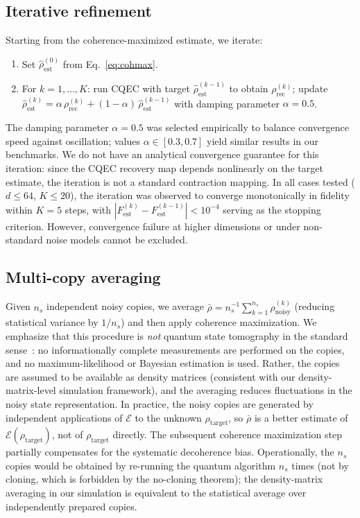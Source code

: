 \documentclass[a4paper,onecolumn]{quantumarticle}
\newcommand{\EE}{\mathcal{E}}
\newcommand{\Fest}{F_\mathrm{est}}
\newcommand{\rhot}{\rho_\mathrm{target}}
\newcommand{\rhon}{\rho_\mathrm{noisy}}
\newcommand{\rhor}{\rho_\mathrm{rec}}
\newcommand{\rhoe}{\hat{\rho}_\mathrm{est}}
\begin{document}
\subsection{Iterative refinement}
\label{sec:iterative}

Starting from the coherence-maximized estimate, we iterate:
\begin{enumerate}
\item Set $\rhoe^{(0)}$ from Eq.~\eqref{eq:cohmax}.
\item For $k = 1, \ldots, K$: run CQEC with target $\rhoe^{(k-1)}$ to obtain $\rhor^{(k)}$; update $\rhoe^{(k)} = \alpha\,\rhor^{(k)} + (1-\alpha)\,\rhoe^{(k-1)}$ with damping parameter $\alpha = 0.5$.
\end{enumerate}
The damping parameter $\alpha = 0.5$ was selected empirically to balance convergence speed against oscillation; values $\alpha \in [0.3, 0.7]$ yield similar results in our benchmarks.
We do not have an analytical convergence guarantee for this iteration: since the CQEC recovery map depends nonlinearly on the target estimate, the iteration is not a standard contraction mapping.
In all cases tested ($d \leq 64$, $K \leq 20$), the iteration was observed to converge monotonically in fidelity within $K = 5$ steps, with $|\Fest^{(k)} - \Fest^{(k-1)}| < 10^{-4}$ serving as the stopping criterion.
However, convergence failure at higher dimensions or under non-standard noise models cannot be excluded.

\subsection{Multi-copy averaging}
\label{sec:multicopy}

Given $n_s$ independent noisy copies, we average $\bar\rho = n_s^{-1}\sum_{k=1}^{n_s} \rhon^{(k)}$ (reducing statistical variance by $1/n_s$) and then apply coherence maximization.
We emphasize that this procedure is \emph{not} quantum state tomography in the standard sense~\cite{Hradil1997,Haah2017}: no informationally complete measurements are performed on the copies, and no maximum-likelihood or Bayesian estimation is used.
Rather, the copies are assumed to be available as density matrices (consistent with our density-matrix-level simulation framework), and the averaging reduces fluctuations in the noisy state representation.
In practice, the noisy copies are generated by independent applications of $\EE$ to the unknown $\rhot$, so $\bar\rho$ is a better estimate of $\EE(\rhot)$, not of $\rhot$ directly.
The subsequent coherence maximization step partially compensates for the systematic decoherence bias.
Operationally, the $n_s$ copies would be obtained by re-running the quantum algorithm $n_s$ times (not by cloning, which is forbidden by the no-cloning theorem); the density-matrix averaging in our simulation is equivalent to the statistical average over independently prepared copies.
\end{document}
